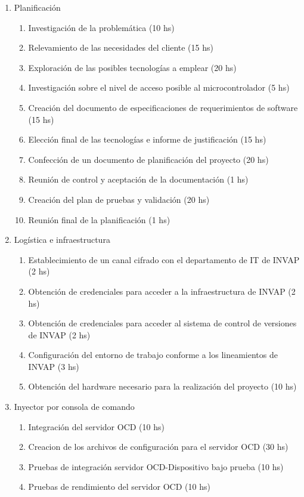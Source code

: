 \documentclass[
11pt, %
]{charter}
\begin{document}
\begin{enumerate}
\item Planificación
	\begin{enumerate}
	\item Investigación de la problemática (10 hs)
	\item Relevamiento de las necesidades del cliente (15 hs)
	\item Exploración de las posibles tecnologías a emplear (20 hs)
	\item Investigación sobre el nivel de acceso posible al microcontrolador (5 hs)
	\item Creación del documento de especificaciones de requerimientos de software (15 hs)
	\item Elección final de las tecnologías e informe de justificación (15 hs)
	\item Confección de un documento de planificación del proyecto (20 hs)
	\item Reunión de control y aceptación de la documentación (1 hs)
	\item Creación del plan de pruebas y validación (20 hs)
	\item Reunión final de la planificación (1 hs)
	\end{enumerate}
\item Logística e infraestructura
	\begin{enumerate}
	\item Establecimiento de un canal cifrado con el departamento de IT de INVAP (2 hs)
	\item Obtención de credenciales para acceder a la infraestructura de INVAP (2 hs)
	\item Obtención de credenciales para acceder al sistema de control de versiones de INVAP (2 hs)
	\item Configuración del entorno de trabajo conforme a los lineamientos de INVAP (3 hs)
	\item Obtención del hardware necesario para la realización del proyecto (10 hs)
	\end{enumerate}
\item Inyector por consola de comando
	\begin{enumerate}
	\item Integración del servidor OCD (10 hs)
	\item Creacion de los archivos de configuración para el servidor OCD (30 hs)
	\item Pruebas de integración servidor OCD-Dispositivo bajo prueba (10 hs)
	\item Pruebas de rendimiento del servidor OCD (10 hs)

\end{enumerate}
\end{enumerate}
\end{document}
